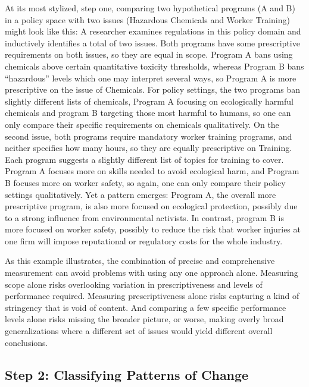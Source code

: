 \documentclass[
      12pt,
            Review ]{article}
\begin{document}
At its most stylized, step one, comparing two hypothetical programs (A
and B) in a policy space with two issues (Hazardous Chemicals and Worker
Training) might look like this: A researcher examines regulations in
this policy domain and inductively identifies a total of two issues.
Both programs have some prescriptive requirements on both issues, so
they are equal in scope. Program A bans using chemicals above certain
quantitative toxicity thresholds, whereas Program B bans ``hazardous''
levels which one may interpret several ways, so Program A is more
prescriptive on the issue of Chemicals. For policy settings, the two
programs ban slightly different lists of chemicals, Program A focusing
on ecologically harmful chemicals and program B targeting those most
harmful to humans, so one can only compare their specific requirements
on chemicals qualitatively. On the second issue, both programs require
mandatory worker training programs, and neither specifies how many
hours, so they are equally prescriptive on Training. Each program
suggests a slightly different list of topics for training to cover.
Program A focuses more on skills needed to avoid ecological harm, and
Program B focuses more on worker safety, so again, one can only compare
their policy settings qualitatively. Yet a pattern emerges: Program A,
the overall more prescriptive program, is also more focused on
ecological protection, possibly due to a strong influence from
environmental activists. In contrast, program B is more focused on
worker safety, possibly to reduce the risk that worker injuries at one
firm will impose reputational or regulatory costs for the whole
industry.

As this example illustrates, the combination of precise and
comprehensive measurement can avoid problems with using any one approach
alone. Measuring scope alone risks overlooking variation in
prescriptiveness and levels of performance required. Measuring
prescriptiveness alone risks capturing a kind of stringency that is void
of content. And comparing a few specific performance levels alone risks
missing the broader picture, or worse, making overly broad
generalizations where a different set of issues would yield different
overall conclusions.

\subsection{Step 2: Classifying Patterns of
Change}\label{step-2-classifying-patterns-of-change}
\end{document}

